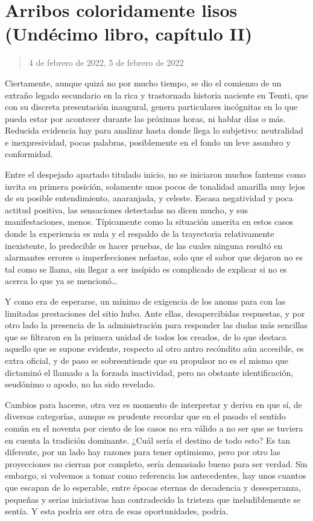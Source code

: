 \documentclass[
]{book}
\begin{document}
\hypertarget{arribos-coloridamente-lisos-unduxe9cimo-libro-capuxedtulo-ii}{%
\section{Arribos coloridamente lisos (Undécimo libro, capítulo II)}\label{arribos-coloridamente-lisos-unduxe9cimo-libro-capuxedtulo-ii}}

\begin{quote}
4 de febrero de 2022, 5 de febrero de 2022
\end{quote}

Ciertamente, aunque quizá no por mucho tiempo, se dio el comienzo de un extraño legado secundario en la rica y trastornada historia naciente en Temti, que con su discreta presentación inaugural, genera particulares incógnitas en lo que pueda estar por acontecer durante las próximas horas, ni hablar días o más. Reducida evidencia hay para analizar hasta donde llega lo subjetivo: neutralidad e inexpresividad, pocas palabras, posiblemente en el fondo un leve asombro y conformidad.

Entre el despejado apartado titulado inicio, no se iniciaron muchos fantems como invita su primera posición, solamente unos pocos de tonalidad amarilla muy lejos de su posible entendimiento, anaranjada, y celeste. Escasa negatividad y poca actitud positiva, las sensaciones detectadas no dicen mucho, y sus manifestaciones, menos. Típicamente como la situación amerita en estos casos donde la experiencia es nula y el respaldo de la trayectoria relativamente inexistente, lo predecible es hacer pruebas, de las cuales ninguna resultó en alarmantes errores o imperfecciones nefastas, solo que el sabor que dejaron no es tal como se llama, sin llegar a ser insípido es complicado de explicar si no es acerca lo que ya se mencionó\ldots{}

Y como era de esperarse, un mínimo de exigencia de los anoms para con las limitadas prestaciones del sitio hubo. Ante ellas, desapercibidas respuestas, y por otro lado la presencia de la administración para responder las dudas más sencillas que se filtraron en la primera unidad de todos los creados, de lo que destaca aquello que se supone evidente, respecto al otro antro recóndito aún accesible, es extra oficial, y de paso se sobreentiende que su propulsor no es el mismo que dictaminó el llamado a la forzada inactividad, pero no obstante identificación, seudónimo o apodo, no ha sido revelado.

Cambios para hacerse, otra vez es momento de interpretar y deriva en que sí, de diversas categorías, aunque es prudente recordar que en el pasado el sentido común en el noventa por ciento de los casos no era válido a no ser que se tuviera en cuenta la tradición dominante. ¿Cuál sería el destino de todo esto? Es tan diferente, por un lado hay razones para tener optimismo, pero por otro las proyecciones no cierran por completo, sería demasiado bueno para ser verdad. Sin embargo, si volvemos a tomar como referencia los antecedentes, hay unos cuantos que escapan de lo esperable, entre épocas eternas de decadencia y desesperanza, pequeñas y serias iniciativas han contradecido la tristeza que ineludiblemente se sentía. Y esta podría ser otra de esas oportunidades, podría.
\end{document}
